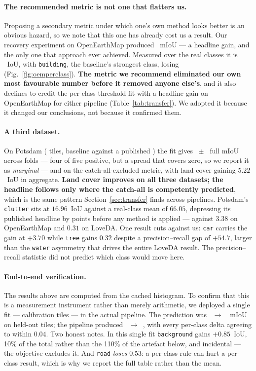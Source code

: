 \documentclass[10pt,a4paper]{article}                        %
\newcommand{\best}[1]{\textbf{#1}}
\newcommand{\bg}{\texttt{background}}
\begin{document}
\paragraph{The recommended metric is not one that flatters us.} Proposing a
secondary metric under which one's own method looks better is an obvious hazard,
so we note that this one has already cost us a result. Our recovery experiment on
OpenEarthMap produced \recoverOEM{}~mIoU --- a headline gain, and the only one that
approach ever achieved. Measured over the real classes it is
\oemRealLoss{}~IoU, with \texttt{building}, the baseline's strongest class, losing
\oemBuildLoss{} (Fig.~\ref{fig:oemperclass}). \best{The metric we recommend
eliminated our own most favourable number before it removed anyone else's}, and it
also declines to credit the per-class threshold fit with a headline gain on
OpenEarthMap for either pipeline (Table~\ref{tab:transfer}). We adopted it because
it changed our conclusions, not because it confirmed them.

\paragraph{A third dataset.} On Potsdam (\potsTiles{} tiles, \potsBase{} baseline
against a published \potsPub{}) the fit gives \potsFull{}~$\pm$~\potsFullSd{} full
mIoU across folds --- four of five positive, but a spread that covers zero, so we
report it as \emph{marginal} --- and \potsReal{} on the catch-all-excluded metric,
with land cover gaining $5.22$~IoU in aggregate. \best{Land cover improves on all
three datasets; the headline follows only where the catch-all is competently
predicted}, which is the same pattern Section~\ref{sec:transfer} finds across
pipelines. Potsdam's \texttt{clutter} sits at $16.96$~IoU against a real-class mean
of $66.05$, depressing its published headline by \potsDistort{} points before any
method is applied --- against $3.38$ on OpenEarthMap and $0.31$ on LoveDA. One
result cuts against us: \texttt{car} carries the gain at $+3.70$ while
\texttt{tree} gains $0.32$ despite a precision--recall gap of $+54.7$, larger than
the \texttt{water} asymmetry that drives the entire LoveDA result. The
precision--recall statistic did not predict which class would move here.

\paragraph{End-to-end verification.} The results above are computed from the
cached histogram. To confirm that this is a measurement instrument rather than
merely arithmetic, we deployed a single fit --- \calibTiles{} calibration tiles ---
in the actual pipeline. The prediction was \eeBase{}~$\to$~\eeFit{}~mIoU on
\eeTiles{} held-out tiles; the pipeline produced \eeBase{}~$\to$~\eeFit{}, with
every per-class delta agreeing to within $0.04$. Two honest notes. In this single
fit \bg{} gains $+0.85$~IoU, 10\% of the total rather than the
110\% of the artefact below, and incidental --- the objective
excludes it. And \texttt{road} \emph{loses} $0.53$: a per-class rule can hurt a
per-class result, which is why we report the full table rather than the mean.
\end{document}
